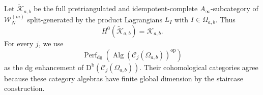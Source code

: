 \documentclass[12pt,a4paper,english,reqno]{amsart}
\theoremstyle{plain}
\theoremstyle{definition}
\newcommand{\Db}{\mathrm D^{\mathrm b}}
\newcommand{\op}{\mathrm{op}}
\newcommand{\C}{\mathcal C}
\newcommand{\Wcat}{\mathcal W}
\begin{document}
Let $\widetilde{\mathcal K}_{a,b}$ be the full pretriangulated and
idempotent-complete $A_\infty$-subcategory of $\Wcat_N^{(m)}$ split-generated
by the product Lagrangians $L_I$ with
$I\in\overline\Omega_{a,b}$.  Thus
\begin{equation}
 H^0(\widetilde{\mathcal K}_{a,b})=\mathcal K_{a,b}.
\label{eq:enhanced-K}
\end{equation}
For every $j$, we use
\begin{equation}
 \operatorname{Perf}_{\mathrm{dg}}
 \!\left(\operatorname{Alg}(\C_j(\Omega_{a,b}))^{\op}\right)
\label{eq:enhanced-Cj}
\end{equation}
as the dg enhancement of $\Db(\C_j(\Omega_{a,b}))$.  Their cohomological
categories agree because these category algebras have finite global
dimension by the staircase construction.
\end{document}

